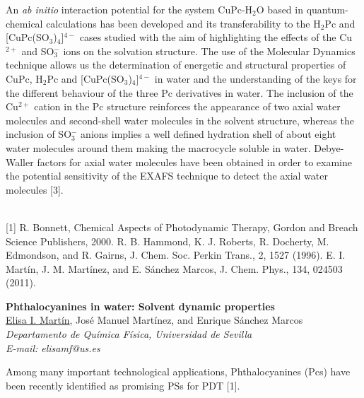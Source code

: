 An \textit{ab initio} interaction potential for the system CuPc-H$_{2}$O based in quantum-chemical calculations
has been developed and its transferability to the H$_{2}$Pc and [CuPc(SO$_{3}$)$_{4}$]$^{4-}$ cases studied
with the aim of highlighting the effects of the Cu$^{2+}$ and SO$_{3}^{-}$ ions on the solvation structure.
The use of the Molecular Dynamics technique allows us the determination of energetic and structural properties of
CuPc, H$_{2}$Pc and [CuPc(SO$_{3}$)$_{4}$]$^{4-}$ in water and the understanding of the keys
for the different behaviour of the three Pc derivatives in water. The inclusion of the Cu$^{2+}$ cation
in the Pc structure reinforces the appearance of two axial water molecules and second-shell water
molecules in the solvent structure, whereas the inclusion of SO$_{3}^{-}$ anions implies a well defined
hydration shell of about eight water molecules around them making the macrocycle soluble in water.
Debye-Waller factors for axial water molecules have been obtained in order to examine the
potential sensitivity of the EXAFS technique to detect the axial water molecules [3].
\begin{figure}[h]
 \centerline{}
 \caption[]{ }
\end{figure}
\\
{\footnotesize
[1] R. Bonnett, Chemical Aspects of Photodynamic Therapy, Gordon and Breach Science Publishers, 2000.
\newline
[2] R. B. Hammond, K. J. Roberts, R. Docherty, M. Edmondson, and R. Gairns, J. Chem. Soc. Perkin Trans., 2, 1527
(1996).
\newline
[3] E. I. Martín, J. M. Martínez, and E. Sánchez Marcos, J. Chem. Phys., 134, 024503 (2011).
}
\newpage
\setcounter{figure}{0}
\begin{center}
{\bf \Large
Phthalocyanines in water: Solvent dynamic properties
}
\\
\vspace{0.5cm}
\underline{Elisa I. Martín}, José Manuel Martínez, and Enrique Sánchez Marcos
\\
\vspace{0.5cm}
{\it
Departamento de Química Física, Universidad de Sevilla
}
\\
\vspace{0.5cm}
{\it E-mail: elisamf@us.es}
\\
\vspace{0.5cm}
\end{center}
Among many important technological applications, Phthalocyanines (Pcs) have been recently identified as promising PSs for PDT [1].

